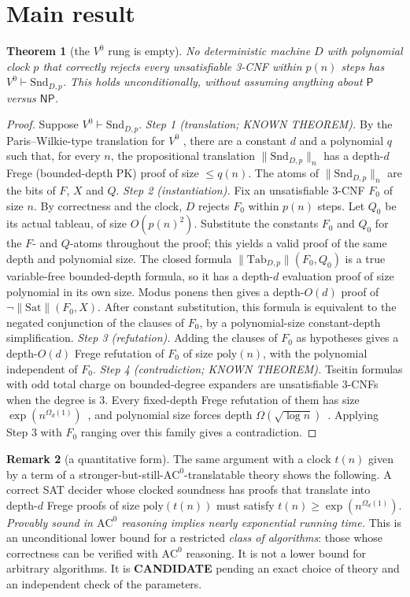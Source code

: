 \documentclass[11pt]{article}
\newtheorem{theorem}{Theorem}
\theoremstyle{definition}
\newtheorem{remark}[theorem]{Remark}
\newcommand{\Snd}{\mathrm{Snd}}
\begin{document}
\section{Main result}
\begin{theorem}[the $V^0$ rung is empty]\label{thm:v0}
No deterministic machine $D$ with polynomial clock $p$ that correctly rejects every unsatisfiable 3-CNF
within $p(n)$ steps has $V^0\vdash\Snd_{D,p}$. This holds unconditionally, without assuming anything
about $\mathsf P$ versus $\mathsf{NP}$.
\end{theorem}
\begin{proof}
Suppose $V^0\vdash\Snd_{D,p}$.
\emph{Step 1 (translation; KNOWN THEOREM).} By the Paris--Wilkie-type translation for $V^0$
\cite[Thm.~VII.2.3]{CN10}, there are a constant $d$ and a polynomial $q$ such that, for every $n$,
the propositional translation $\|\Snd_{D,p}\|_n$ has a depth-$d$ Frege (bounded-depth PK) proof of size $\le q(n)$.
The atoms of $\|\Snd_{D,p}\|_n$ are the bits of $F$, $X$ and $Q$.
\emph{Step 2 (instantiation).} Fix an unsatisfiable 3-CNF $F_0$ of size $n$. By correctness and the clock,
$D$ rejects $F_0$ within $p(n)$ steps. Let $Q_0$ be its actual tableau, of size $O(p(n)^2)$.
Substitute the constants $F_0$ and $Q_0$ for the $F$- and $Q$-atoms throughout the proof; this yields
a valid proof of the same depth and polynomial size. The closed formula $\|\mathrm{Tab}_{D,p}\|(F_0,Q_0)$
is a true variable-free bounded-depth formula, so it has a depth-$d$ evaluation proof of size polynomial
in its own size. Modus ponens then gives a depth-$O(d)$ proof of $\neg\|\mathrm{Sat}\|(F_0,X)$.
After constant substitution, this formula is equivalent to the negated conjunction of the clauses of $F_0$,
by a polynomial-size constant-depth simplification.
\emph{Step 3 (refutation).} Adding the clauses of $F_0$ as hypotheses gives a depth-$O(d)$ Frege
refutation of $F_0$ of size $\mathrm{poly}(n)$, with the polynomial independent of $F_0$.
\emph{Step 4 (contradiction; KNOWN THEOREM).} Tseitin formulas with odd total charge on bounded-degree
expanders are unsatisfiable 3-CNFs when the degree is 3. Every fixed-depth Frege refutation of them has
size $\exp(n^{\Omega_d(1)})$~\cite{BS02}, and polynomial size forces depth $\Omega(\sqrt{\log n})$~\cite{PRST16}.
Applying Step 3 with $F_0$ ranging over this family gives a contradiction.
\end{proof}

\begin{remark}[a quantitative form]
The same argument with a clock $t(n)$ given by a term of a stronger-but-still-$\mathrm{AC}^0$-translatable
theory shows the following. A correct SAT decider whose clocked soundness has proofs that translate
into depth-$d$ Frege proofs of size $\mathrm{poly}(t(n))$ must satisfy $t(n)\ge\exp(n^{\Omega_d(1)})$.
\emph{Provably sound in $\mathrm{AC}^0$ reasoning implies nearly exponential running time.}
This is an unconditional lower bound for a restricted \emph{class of algorithms}: those whose correctness
can be verified with $\mathrm{AC}^0$ reasoning. It is not a lower bound for arbitrary algorithms.
It is \textbf{CANDIDATE} pending an exact choice of theory and an independent check of the parameters.
\end{remark}
\end{document}
